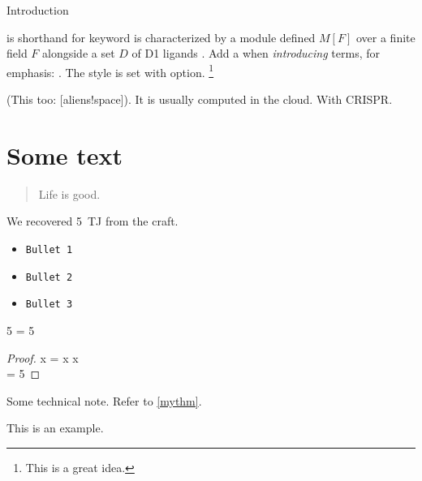 
\begin{MainChapter}{Introduction}




 is shorthand for keyword
 is characterized by a module defined $M[F]$ over a finite field $F$ alongside a set $D$ of \ac{D1} ligands \cite{yolov6}.
Add a \code{*} when \emph{introducing} terms, for emphasis: .
The style is set with  option. \footnote{This is a great idea.}

(This too: [aliens!space]).
It is usually computed in the cloud. With \ac{CRISPR}.

\section{Some text}

\blockcquote{johnson2022}{Life is good.}

We recovered \qty{5}{\tera\joule} from the craft.

\begin{itemize}
    \item\texttt{Bullet 1}
    \item\texttt{Bullet 2}
    \item\texttt{Bullet 3}
\end{itemize}

\begin{criterion}[label=mythm, name=Fiveness]
5 = 5
\end{criterion}

\begin{proof}
x = x \forall x\\
 = 5
\end{proof}

\begin{BoxNote}
Some technical note.
Refer to \cref{mythm}.
\end{BoxNote}

\begin{BoxExample}
This is an example.
\end{BoxExample}



\end{MainChapter}
